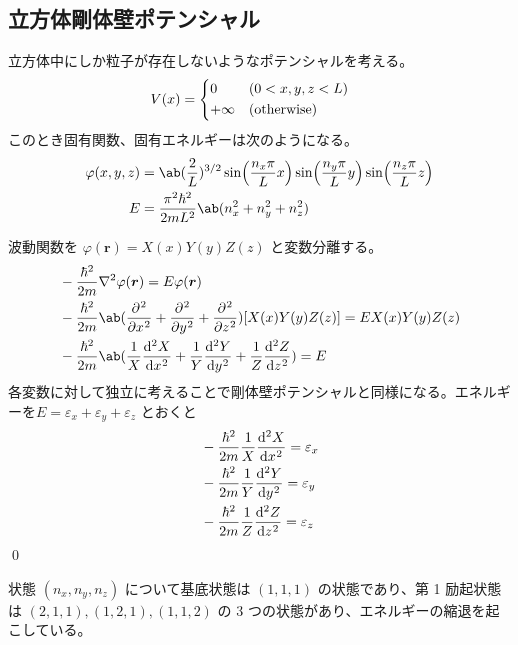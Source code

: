 \documentclass[uplatex,dvipdfmx,a4paper,11pt]{jlreq}
\makeatletter
\newcommand{\rr}{\bm{r}}
\numberwithin{equation}{section}
\theoremstyle{definition}
\renewenvironment{proof}[1][\proofname]{\par
  \normalfont
  \topsep6\p@\@plus6\p@ \trivlist
  \item[\hskip\labelsep{\bfseries #1}\@addpunct{\bfseries}]\ignorespaces\quad\par
}{%
  \qed\endtrivlist\@endpefalse
}
\renewcommand\proofname{証明}
\makeatother
\begin{document}
\subsection{立方体剛体壁ポテンシャル}
\begin{proposition}
  立方体中にしか粒子が存在しないようなポテンシャルを考える。
  \begin{align}
    V(x) & = \begin{cases*}
               0        & ($0 < x, y, z < L$) \\
               + \infty & (otherwise)
             \end{cases*}
  \end{align}
  このとき固有関数、固有エネルギーは次のようになる。
  \begin{align}
    \varphi(x, y, z) & = \ab(\frac{2}{L})^{3/2}\sin(\frac{n_x\pi}{L}x)\sin(\frac{n_y\pi}{L}y)\sin(\frac{n_z\pi}{L}z) \\
    E                & = \frac{\pi^2\hbar^2}{2mL^2}\ab(n_x^2 + n_y^2 + n_z^2)
  \end{align}
\end{proposition}
\begin{proof}
  波動関数を $\varphi(\rr) = X(x)Y(y)Z(z)$ と変数分離する。
  \begin{align}
     & -\frac{\hbar^2}{2m}\nabla^2\varphi(\rr) = E\varphi(\rr)                                                       \\
     & -\frac{\hbar^2}{2m}\ab(\diffp[2]{}{x} + \diffp[2]{}{y} + \diffp[2]{}{z})[X(x)Y(y)Z(z)] = EX(x)Y(y)Z(z)        \\
     & -\frac{\hbar^2}{2m}\ab(\frac{1}{X}\diff[2]{X}{x} + \frac{1}{Y}\diff[2]{Y}{y} + \frac{1}{Z}\diff[2]{Z}{z}) = E
  \end{align}
  各変数に対して独立に考えることで剛体壁ポテンシャルと同様になる。エネルギーを$E = \varepsilon_x + \varepsilon_y + \varepsilon_z$ とおくと
  \begin{align}
     & -\frac{\hbar^2}{2m}\frac{1}{X}\diff[2]{X}{x} = \varepsilon_x \\
     & -\frac{\hbar^2}{2m}\frac{1}{Y}\diff[2]{Y}{y} = \varepsilon_y \\
     & -\frac{\hbar^2}{2m}\frac{1}{Z}\diff[2]{Z}{z} = \varepsilon_z
  \end{align}
\end{proof}

状態 $(n_x, n_y, n_z)$ について基底状態は $(1, 1, 1)$ の状態であり、第 1 励起状態は $(2, 1, 1), (1, 2, 1), (1, 1, 2)$ の 3 つの状態があり、エネルギーの縮退を起こしている。
\end{document}
